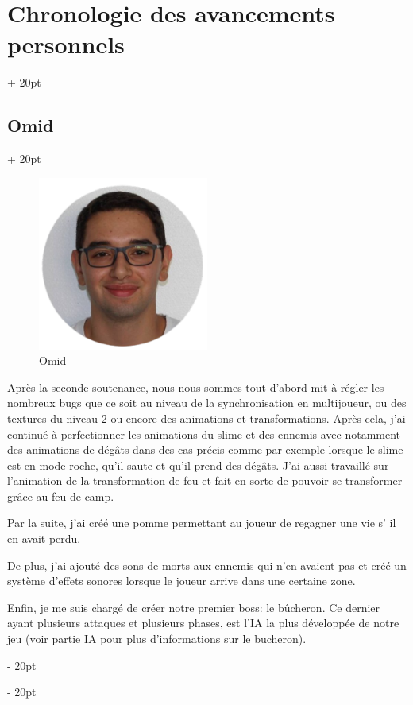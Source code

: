\documentclass[a4paper, 12pt, twoside]{article}
\newcommand{\ind}[1][20pt]{\advance\leftskip + #1}
\newcommand{\deind}[1][20pt]{\advance\leftskip - #1}
\newenvironment{indt}[2][20pt]{#2 \par \ind[#1]}{\par \deind} %
\begin{document}
\begin{indt}{\section{Chronologie des avancements personnels}}
        \begin{indt}{\subsection{Omid}}
            \begin{figure}[h]
                \centering
                \includegraphics[width=0.5\textwidth]{omid.png}
                \caption{Omid}
                \label{fig:mesh1}
            \end{figure}

            Après la seconde soutenance, nous nous sommes tout d’abord mit à régler les nombreux bugs que ce soit au niveau de la synchronisation en multijoueur, ou des textures du niveau 2 ou encore des animations et transformations. Après cela, j’ai continué à perfectionner les animations du slime et des ennemis avec notamment des animations de dégâts dans des cas précis comme par exemple lorsque le slime est en mode roche, qu’il saute et qu’il prend des dégâts. J’ai aussi travaillé sur l’animation de la transformation de feu et fait en sorte de pouvoir se transformer grâce au feu de camp.

            Par la suite, j’ai créé une pomme permettant au joueur de regagner une vie s' il en avait perdu.

            De plus, j’ai ajouté des sons de morts aux ennemis qui n’en avaient pas et créé un système d’effets sonores lorsque le joueur arrive dans une certaine zone.

            Enfin, je me suis chargé de créer notre premier boss: le bûcheron. Ce dernier ayant plusieurs attaques et plusieurs phases, est l’IA la plus développée de notre jeu (voir partie IA pour plus d’informations sur le bucheron).
        \end{indt}


\end{indt}
\end{document}
